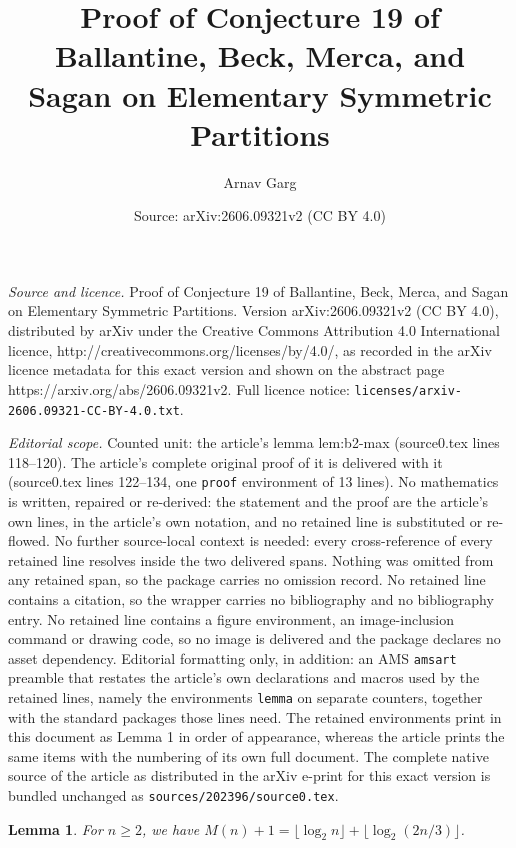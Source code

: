 \documentclass[10pt,a4paper]{amsart}
\title{Proof of Conjecture 19 of Ballantine, Beck, Merca, and Sagan on Elementary Symmetric Partitions}
\author{Arnav Garg}
\date{Source: arXiv:2606.09321v2 (CC BY 4.0)}
\newtheorem{lemma}{Lemma}
\begin{document}
\maketitle

\noindent\emph{Source and licence.} Proof of Conjecture 19 of Ballantine, Beck, Merca, and Sagan on Elementary Symmetric Partitions. Version arXiv:2606.09321v2 (CC BY 4.0), distributed by arXiv under the Creative Commons Attribution 4.0 International licence, http://creativecommons.org/licenses/by/4.0/, as recorded in the arXiv licence metadata for this exact version and shown on the abstract page https://arxiv.org/abs/2606.09321v2. Full licence notice: \texttt{licenses/arxiv-2606.09321-CC-BY-4.0.txt}.\par\smallskip

\noindent\textit{Editorial scope.} Counted unit: the article's lemma lem:b2-max (source0.tex lines 118--120). The article's complete original proof of it is delivered with it (source0.tex lines 122--134, one \texttt{proof} environment of 13 lines). No mathematics is written, repaired or re-derived: the statement and the proof are the article's own lines, in the article's own notation, and no retained line is substituted or re-flowed.  No further source-local context is needed: every cross-reference of every retained line resolves inside the two delivered spans.  Nothing was omitted from any retained span, so the package carries no omission record.  No retained line contains a citation, so the wrapper carries no bibliography and no bibliography entry.  No retained line contains a figure environment, an image-inclusion command or drawing code, so no image is delivered and the package declares no asset dependency.  Editorial formatting only, in addition: an AMS \texttt{amsart} preamble that restates the article's own declarations and macros used by the retained lines, namely the environments \texttt{lemma} on separate counters, together with the standard packages those lines need.  The retained environments print in this document as Lemma 1 in order of appearance, whereas the article prints the same items with the numbering of its own full document.  The complete native source of the article as distributed in the arXiv e-print for this exact version is bundled unchanged as \texttt{sources/202396/source0.tex}.
\begin{lemma}\label{lem:b2-max}
For $n \geq 2$, we have $M(n) + 1 = \lfloor \log_2 n \rfloor + \lfloor \log_2(2n/3) \rfloor$.
\end{lemma}
\end{document}
